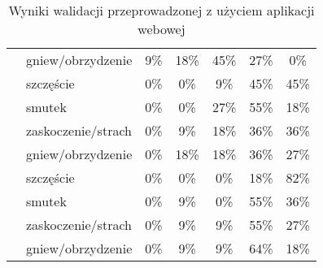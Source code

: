 \begin{table}[h]
\begin{tabular}{|c|l|c|c|c|c|c|}
\cline{2-7}
                                 & gniew/obrzydzenie                                     & 9\%        & 18\%       & \textcolor[rgb]{0,0.588,0}{45\%} & 27\%                               & 0\%                                 \\ 
\hhline{|=======|}
\multirow{4}{*}{\ref{avatar_3}}          & szczęście                                             & 0\%        & 0\%        & 9\%                              & \textcolor[rgb]{0,0.588,0}{45\%}   & \textcolor[rgb]{0,0.588,0}{45\%}    \\ 
\cline{2-7}
                                 & smutek                                                & 0\%        & 0\%        & 27\%                             & \textcolor[rgb]{0,0.588,0}{55\%}   & 18\%                                \\ 
\cline{2-7}
                                 & zaskoczenie/strach                                    & 0\%        & 9\%        & 18\%                             & \textcolor[rgb]{0,0.588,0}{36\%}   & \textcolor[rgb]{0,0.588,0}{36\%}    \\ 
\cline{2-7}
                                 & gniew/obrzydzenie                                     & 0\%        & 18\%       & 18\%                             & \textcolor[rgb]{0,0.588,0}{36\%}   & 27\%                                \\ 
\hhline{|=======|}
\multirow{4}{*}{\ref{avatar_4}}         & szczęście                                             & 0\%        & 0\%        & 0\%                              & 18\%                               & \textcolor[rgb]{0,0.588,0}{82\%}    \\ 
\cline{2-7}
                                 & smutek                                                & 0\%        & 9\%        & 0\%                              & \textcolor[rgb]{0,0.588,0}{55\%}   & 36\%                                \\ 
\cline{2-7}
                                 & zaskoczenie/strach                                    & 0\%        & 9\%        & 9\%                              & \textcolor[rgb]{0,0.588,0}{55\%}   & 27\%                                \\ 
\cline{2-7}
                                 & gniew/obrzydzenie                                     & 0\%        & 9\%        & 9\%                              & \textcolor[rgb]{0,0.588,0}{64\%}   & 18\%                                \\
\hline
\end{tabular}
\caption{Wyniki walidacji przeprowadzonej z użyciem aplikacji webowej}
\label{tab:first_test}
\end{table}

